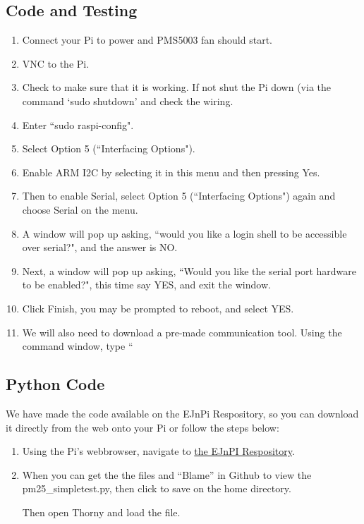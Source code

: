 \documentclass{article}
\begin{document}
\subsection{Code and Testing}

\begin{enumerate}
  \item Connect your Pi to power and PMS5003 fan should start.
  \item VNC to the Pi.
  \item Check to make sure that it is working. If not shut the Pi down (via the command `sudo shutdown' and check the wiring. 

\item Enter ``sudo raspi-config".

\item Select Option 5 (``Interfacing Options").

\item Enable ARM I2C by selecting it in this menu and then pressing Yes.

\item Then to enable Serial, select Option 5 (``Interfacing Options") again and choose Serial on the menu. 

\item A window will pop up asking, ``would you like a login shell to be accessible over serial?", and the answer is NO.

\item Next, a window will pop up asking, ``Would you like the serial port hardware to be enabled?", this time say YES, and exit the window.

\item Click Finish, you may be prompted to reboot, and select YES.

\item We will also need to download a pre-made communication tool.  Using the command window, type ``

\end{enumerate}

\subsection{Python Code}

We have made the code available on the EJnPi Respository, so you can download it directly from the web onto your Pi or follow the steps below:

\begin{enumerate}

\item Using the Pi's webbrowser, navigate to \href{https://github.com/marclos/EJnPi/tree/master/code}{the EJnPI Respository}. 

\item When you can get the the files and ``Blame'' in Github to view the pm25\_simpletest.py, then click to save on the home directory.

Then open Thorny and load the file.



\end{enumerate}
\end{document}
